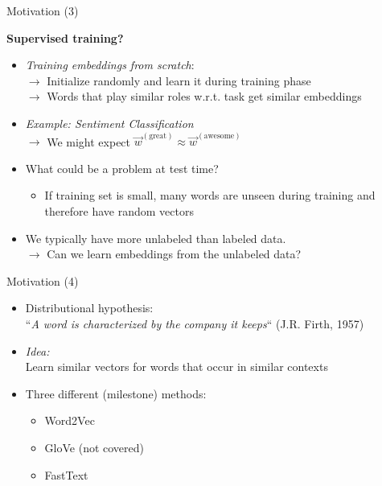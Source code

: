 \begin{vbframe}{Motivation (3)}

\vfill

\textbf{Supervised training?}

\begin{itemize}
	\item \textit{Training embeddings from scratch}:
	\\ $\rightarrow$ Initialize randomly and learn it during training phase
	\\ $\rightarrow$ Words that play similar roles w.r.t. task get similar embeddings
	\item \textit{Example: Sentiment Classification} 
	\\ $\rightarrow$ We might expect $\vec w^{(\text{great})} \approx \vec w^{(\text{awesome})}$
	\item \ques What could be a problem at test time?
	\begin{itemize}
		\item If training set is small, many words are unseen during training and therefore have random vectors
	\end{itemize}
	\item We typically have more unlabeled than labeled data.
	\\ $\rightarrow$ Can we learn embeddings from the unlabeled data?
\end{itemize}

\vfill

\end{vbframe}


\begin{vbframe}{Motivation (4)}

\vfill

\begin{itemize}
	\item Distributional hypothesis: 
	\\ {\centering ``\textit{A word is characterized by the company it keeps}``} (J.R. Firth, 1957)
	\item \textit{Idea:}\\ Learn similar vectors for words that occur in similar contexts
	\item Three different (milestone) methods:
		\begin{itemize}
			\item Word2Vec 
			\item GloVe (not covered) 
			\item FastText 
		\end{itemize}
\end{itemize}

\vfill

\end{vbframe}

